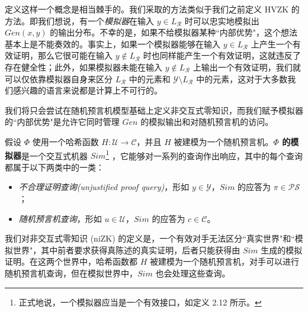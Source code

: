 定义这样一个概念是相当棘手的。我们采取的方法类似于我们之前定义 HVZK 的方法。即我们想说，有一个\emph{模拟器}在输入 $y\in L_{\mathcal R}$ 时可以忠实地模拟出 $Gen(x,y)$ 的输出分布。不幸的是，如果不给模拟器某种``内部优势"，这个想法基本上是不能奏效的。事实上，如果一个模拟器能够在输入 $y\in L_{\mathcal R}$ 上产生一个有效证明，那么它很可能在输入 $y\notin L_{\mathcal R}$ 时也同样能产生一个有效证明，这就违反了存在健全性；此外，如果模拟器未能在输入 $y\notin L_{\mathcal R}$ 上输出一个有效证明，我们就可以仅依靠模拟器自身来区分 $L_{\mathcal R}$ 中的元素和 $\mathcal{Y}\setminus L_{\mathcal R}$ 中的元素，这对于大多数我们感兴趣的语言来说都是计算上不可行的。

我们将只会尝试在随机预言机模型基础上定义非交互式零知识，而我们赋予模拟器的``内部优势"是允许它同时管理 $Gen$ 的模拟输出和对随机预言机的访问。

假设 $\Phi$ 使用一个哈希函数 $H:\mathcal{U}\to\mathcal{C}$，并且 $H$ 被建模为一个随机预言机。\textbf{$\Phi$ 的模拟器}是一个交互式机器 $Sim$\footnote{正式地说，一个模拟器应当是一个有效接口，如定义 2.12 所示。} ，它能够对一系列的查询作出响应，其中的每个查询都属于以下两类中的一类：
\begin{itemize}
	\item \emph{不合理证明查询(unjustified proof query)}，形如 $y\in\mathcal{Y}$，$Sim$ 的应答为 $\pi\in\mathcal{PS}$；
	\item \emph{随机预言机查询}，形如 $u\in\mathcal{U}$，$Sim$ 的应答为 $c\in\mathcal{C}$。
\end{itemize}

我们对非交互式零知识 (niZK) 的定义是，一个有效对手无法区分``真实世界"和``模拟世界"，其中前者要求获得真陈述的真实证明，后者只能获得由 $Sim$ 生成的模拟证明。在这两个世界中，哈希函数都 $H$ 被建模为一个随机预言机，对手可以进行随机预言机查询，但在模拟世界中，$Sim$ 也会处理这些查询。

